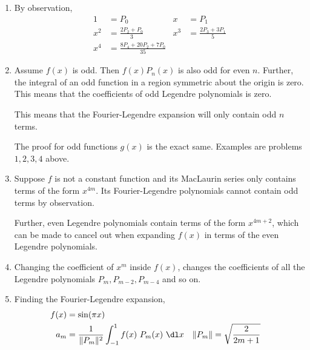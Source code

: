 \begin{enumerate}
    \item By observation,
          \begin{align}
              1   & = P_0                            &
              x   & = P_1                              \\
              x^2 & = \frac{2P_2 + P_0}{3}           &
              x^3 & = \frac{2P_3 + 3P_1}{5}            \\
              x^4 & = \frac{8P_4 + 20P_2 + 7P_0}{35}
          \end{align}

    \item Assume $ f(x) $ is odd. Then $ f(x)P_n(x) $ is also odd for even $ n $.
          Further, the integral of an odd function in a region symmetric about the origin
          is zero. This means that the coefficients of odd Legendre polynomials is zero.
          \par
          This means that the Fourier-Legendre expansion will only contain odd
          $ n $ terms.
          \par
          The proof for odd functions $ g(x) $ is the exact same. Examples are problems
          $ 1,2,3,4 $ above.

    \item Suppose $ f $ is not a constant function and its MacLaurin series only contains
          terms of the form $ x^{4m} $. Its Fourier-Legendre polynomials cannot contain
          odd terms by observation. \par
          Further, even Legendre polynomials contain terms of the form $ x^{4m + 2} $,
          which can be made to cancel out when expanding $ f(x) $ in terms of the even
          Legendre polynomials.

    \item Changing the coefficient of $ x^m $ inside $ f(x) $, changes the
          coefficients of all the Legendre polynomials $ P_m, P_{m-2}, P_{m-4} $
          and so on.

    \item Finding the Fourier-Legendre expansion,
          \begin{align}
              f(x)                              & = \sin(\pi x)                   \\
              a_m                               & = \frac{1}{\lVert P_m \rVert^2}
              \int_{-1}^{1} f(x)\ P_m(x)\ \dl x &
              \lVert P_m \rVert                 & = \sqrt{\frac{2}{2m + 1}}
          \end{align}


\end{enumerate}
